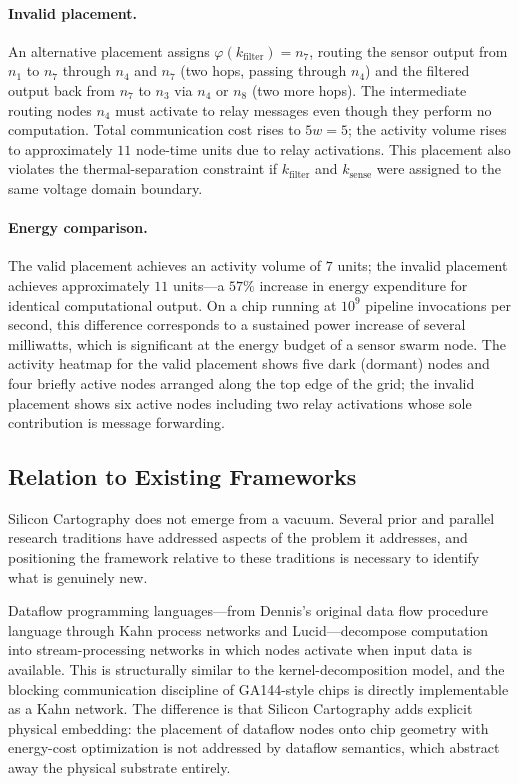 \documentclass[11pt, a4paper]{article}
\begin{document}
\paragraph{Invalid placement.} An alternative placement assigns
$\varphi(k_{\text{filter}}) = n_7$, routing the sensor output from $n_1$ to $n_7$
through $n_4$ and $n_7$ (two hops, passing through $n_4$) and the filtered output
back from $n_7$ to $n_3$ via $n_4$ or $n_8$ (two more hops). The intermediate
routing nodes $n_4$ must activate to relay messages even though they perform no
computation. Total communication cost rises to $5w = 5$; the activity volume
rises to approximately $11$ node-time units due to relay activations. This
placement also violates the thermal-separation constraint if $k_{\text{filter}}$
and $k_{\text{sense}}$ were assigned to the same voltage domain boundary.

\paragraph{Energy comparison.} The valid placement achieves an activity volume
of $7$ units; the invalid placement achieves approximately $11$ units---a $57\%$
increase in energy expenditure for identical computational output. On a chip
running at $10^9$ pipeline invocations per second, this difference corresponds to
a sustained power increase of several milliwatts, which is significant at the
energy budget of a sensor swarm node. The activity heatmap for the valid placement
shows five dark (dormant) nodes and four briefly active nodes arranged along the
top edge of the grid; the invalid placement shows six active nodes including two
relay activations whose sole contribution is message forwarding.

\subsection{Relation to Existing Frameworks}

Silicon Cartography does not emerge from a vacuum. Several prior and parallel
research traditions have addressed aspects of the problem it addresses, and
positioning the framework relative to these traditions is necessary to identify
what is genuinely new.

Dataflow programming languages---from Dennis's original data flow procedure
language through Kahn process networks and Lucid---decompose computation into
stream-processing networks in which nodes activate when input data is available.
This is structurally similar to the kernel-decomposition model, and the blocking
communication discipline of GA144-style chips is directly implementable as a
Kahn network. The difference is that Silicon Cartography adds explicit physical
embedding: the placement of dataflow nodes onto chip geometry with energy-cost
optimization is not addressed by dataflow semantics, which abstract away the
physical substrate entirely.
\end{document}
